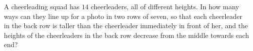 A cheerleading squad has $14$ cheerleaders, all of different heights. In how many ways can they line up for a photo in two rows of seven, so that each cheerleader in the back row is taller than the cheerleader immediately in front of her, and the heights of the cheerleaders in the back row decrease from the middle towards each end?
